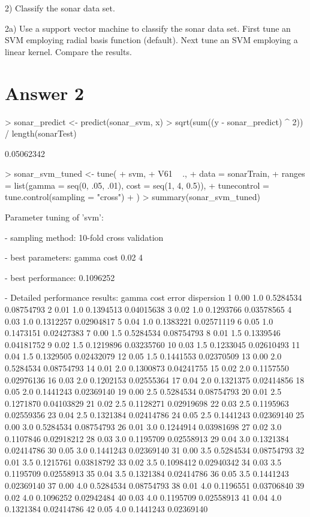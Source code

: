 \documentclass{article}
\begin{document}
2) Classify the sonar data set.

2a) Use a support vector machine to classify the sonar data set. First tune an
SVM employing radial basis function (default). Next tune an SVM employing
a linear kernel. Compare the results.

\section*{Answer  2}

\begin{Schunk}
\begin{Sinput}
> sonar_predict <- predict(sonar_svm, x)
> sqrt(sum((y - sonar_predict) ^ 2)) / length(sonarTest)
\end{Sinput}
\begin{Soutput}
[1] 0.05062342
\end{Soutput}
\begin{Sinput}
> sonar_svm_tuned <- tune(
+   svm,
+   V61 ~ .,
+   data = sonarTrain,
+   ranges = list(gamma = seq(0, .05, .01), cost = seq(1, 4, 0.5)),
+   tunecontrol = tune.control(sampling = "cross")
+ )
> summary(sonar_svm_tuned)
\end{Sinput}
\begin{Soutput}
Parameter tuning of 'svm':

- sampling method: 10-fold cross validation 

- best parameters:
 gamma cost
  0.02    4

- best performance: 0.1096252 

- Detailed performance results:
   gamma cost     error dispersion
1   0.00  1.0 0.5284534 0.08754793
2   0.01  1.0 0.1394513 0.04015638
3   0.02  1.0 0.1293766 0.03578565
4   0.03  1.0 0.1312257 0.02904817
5   0.04  1.0 0.1383221 0.02571119
6   0.05  1.0 0.1473151 0.02427383
7   0.00  1.5 0.5284534 0.08754793
8   0.01  1.5 0.1339546 0.04181752
9   0.02  1.5 0.1219896 0.03235760
10  0.03  1.5 0.1233045 0.02610493
11  0.04  1.5 0.1329505 0.02432079
12  0.05  1.5 0.1441553 0.02370509
13  0.00  2.0 0.5284534 0.08754793
14  0.01  2.0 0.1300873 0.04241755
15  0.02  2.0 0.1157550 0.02976136
16  0.03  2.0 0.1202153 0.02555364
17  0.04  2.0 0.1321375 0.02414856
18  0.05  2.0 0.1441243 0.02369140
19  0.00  2.5 0.5284534 0.08754793
20  0.01  2.5 0.1271870 0.04103829
21  0.02  2.5 0.1128271 0.02919698
22  0.03  2.5 0.1195963 0.02559356
23  0.04  2.5 0.1321384 0.02414786
24  0.05  2.5 0.1441243 0.02369140
25  0.00  3.0 0.5284534 0.08754793
26  0.01  3.0 0.1244914 0.03981698
27  0.02  3.0 0.1107846 0.02918212
28  0.03  3.0 0.1195709 0.02558913
29  0.04  3.0 0.1321384 0.02414786
30  0.05  3.0 0.1441243 0.02369140
31  0.00  3.5 0.5284534 0.08754793
32  0.01  3.5 0.1215761 0.03818792
33  0.02  3.5 0.1098412 0.02940342
34  0.03  3.5 0.1195709 0.02558913
35  0.04  3.5 0.1321384 0.02414786
36  0.05  3.5 0.1441243 0.02369140
37  0.00  4.0 0.5284534 0.08754793
38  0.01  4.0 0.1196551 0.03706840
39  0.02  4.0 0.1096252 0.02942484
40  0.03  4.0 0.1195709 0.02558913
41  0.04  4.0 0.1321384 0.02414786
42  0.05  4.0 0.1441243 0.02369140
\end{Soutput}
\end{Schunk}
\end{document}
